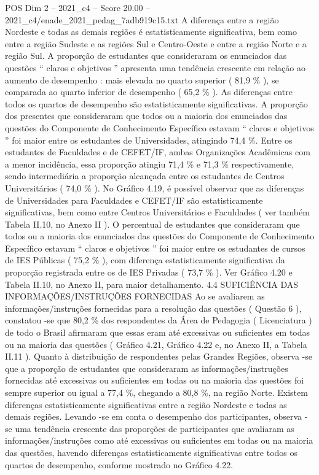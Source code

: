 \begin{textsample}{POS Dim 2 – 2021\_c4 – Score 20.00 – 2021\_c4/enade\_2021\_pedag\_7adb919c15.txt}
A diferença entre a região Nordeste e todas as demais regiões é estatisticamente significativa, bem como entre a região Sudeste e as regiões Sul e Centro-Oeste e entre a região Norte e a região Sul.
A proporção de estudantes que consideraram os enunciados das questões “ claros e objetivos ” apresenta uma tendência crescente em relação ao aumento de desempenho : mais elevada no quarto superior ( 81,9 \% ), se comparada ao quarto inferior de desempenho ( 65,2 \% ).
As diferenças entre todos os quartos de desempenho são estatisticamente significativas.
A proporção dos presentes que consideraram que todos ou a maioria dos enunciados das questões do Componente de Conhecimento Específico estavam “ claros e objetivos ” foi maior entre os estudantes de Universidades, atingindo 74,4 \%.
Entre os estudantes de Faculdades e de CEFET/IF, ambas Organizações Acadêmicas com a menor incidência, essa proporção atingiu 71,4 \% e 71,3 \% respectivamente, sendo intermediária a proporção alcançada entre os estudantes de Centros Universitários ( 74,0 \% ).
No Gráfico 4.19, é possível observar que as diferenças de Universidades para Faculdades e CEFET/IF são estatisticamente significativas, bem como entre Centros Universitários e Faculdades ( ver também Tabela II.10, no Anexo II ).
O percentual de estudantes que consideraram que todos ou a maioria dos enunciados das questões do Componente de Conhecimento Específico estavam “ claros e objetivos ” foi maior entre os estudantes de cursos de IES Públicas ( 75,2 \% ), com diferença estatisticamente significativa da proporção registrada entre os de IES Privadas ( 73,7 \% ).
Ver Gráfico 4.20 e Tabela II.10, no Anexo II, para maior detalhamento. 4.4 SUFICIÊNCIA DAS INFORMAÇÕES/INSTRUÇÕES FORNECIDAS Ao se avaliarem as informações/instruções fornecidas para a resolução das questões ( Questão 6 ), constatou -se que 80,2 \% dos respondentes da Área de Pedagogia ( Licenciatura ) de todo o Brasil afirmaram que essas eram até excessivas ou suficientes em todas ou na maioria das questões ( Gráfico 4.21, Gráfico 4.22 e, no Anexo II, a Tabela II.11 ).
Quanto à distribuição de respondentes pelas Grandes Regiões, observa -se que a proporção de estudantes que consideraram as informações/instruções fornecidas até excessivas ou suficientes em todas ou na maioria das questões foi sempre superior ou igual a 77,4 \%, chegando a 80,8 \%, na região Norte.
Existem diferenças estatisticamente significativas entre a região Nordeste e todas as demais regiões.
Levando -se em conta o desempenho dos participantes, observa -se uma tendência crescente das proporções de participantes que avaliaram as informações/instruções como até excessivas ou suficientes em todas ou na maioria das questões, havendo diferenças estatisticamente significativas entre todos os quartos de desempenho, conforme mostrado no Gráfico 4.22.

\end{textsample}
